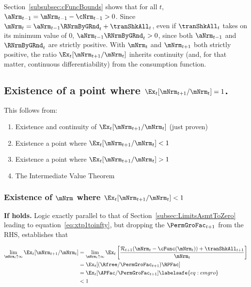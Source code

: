 \documentclass[\econtexRoot/BufferStockTheory]{subfiles}
\begin{document}
Section~\ref{subsubsec:cFuncBounds} shows that for all $t$, $\aNrm_{t-1} = {\mNrm}_{t-1} -  \cNrm_{t-1} > 0$.
Since ${\mNrm}_{t}= {\aNrm}_{t-1} \RNrmByGRnd_{t} + \tranShkAll_{t}$, even if $\tranShkAll_{t}$ takes on its minimum value of 0, $\aNrm_{t-1} \RNrmByGRnd_{t} > 0$, since both $\aNrm_{t-1}$ and $\RNrmByGRnd_{t}$ are strictly positive.
With $\mNrm_{t}$ and $\mNrm_{t+1}$ both strictly positive, the ratio $\Ex_t [{\mNrm}_{t+1}/\mNrm_t]$ inherits continuity (and, for that matter, continuous differentiability) from the consumption function.

\subsection{Existence of a point where
  \texorpdfstring{$\Ex_t [{\mNrm}_{t+1}/\mNrm_t]=1$}
  {Ex-t[mNrm-{t+1}/mNrm-{t}]=1}.}

This follows from:
\begin{enumerate}
\item Existence and continuity of $\Ex_t [{\mNrm}_{t+1}/\mNrm_t]$ (just proven)
  \item Existence a point where $\Ex_t [{\mNrm}_{t+1}/\mNrm_t] < 1$
  \item Existence a point where $\Ex_t [{\mNrm}_{t+1}/\mNrm_t] > 1$
    \item The Intermediate Value Theorem
    \end{enumerate}

\subsubsection{Existence of \texorpdfstring{$\mNrm$}{m} where \texorpdfstring{$\Ex_t [{\mNrm}_{t+1}/\mNrm_t] < 1$}{E[m{t+1}/m{t}}}
  
  
\textbf{If {\RIC} holds.}  Logic exactly parallel to that of Section~\ref{subsec:LimitsAsmtToZero} leading to equation~\eqref{eq:xtp1toinfty}, but dropping the $\PermGroFac_{t+1}$ from the RHS, establishes that
\begin{samepage}
\begin{align}
  \lim_{\mNrm_{t} \uparrow \infty} \Ex_{t}[{\mNrm}_{t+1}/\mNrm_{t}]  & =   
                                                                       \lim_{\mNrm_{t} \uparrow \infty} 
                                                                       \Ex_{t}\left[\frac{{\mathcal{\mathcal{R}}}_{t+1}(\mNrm_{t}-\cFunc(\mNrm_{t}))+{\tranShkAll}_{t+1}}{\mNrm_{t}}\right] \notag 
  \\  & = \Ex_{t}[(\Rfree/{\PermGroFac}_{t+1})\RPFac]  \notag
  \\  & = \Ex_{t}[{\APFac}/{\PermGroFac}_{t+1}]  \labelsafe{eq:emgro}
  \\  & < 1 \notag
\end{align}
\end{samepage}
\end{document}
